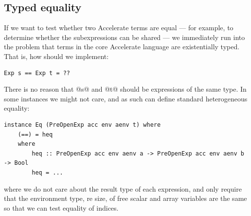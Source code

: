 \subsection{Typed equality}
\label{sec:equality}

If we want to test whether two Accelerate terms are equal --- for example, to
determine whether the subexpressions can be shared --- we immediately run into
the problem that terms in the core Accelerate language are existentially typed.
That is, how should we implement:
%
\begin{lstlisting}[style=haskell]
Exp s == Exp t = ??
\end{lstlisting}
%
There is no reason that @s@ and @t@ should be expressions of the same
type. In some instances we might not care, and as such can define standard
heterogeneous equality:
%
\begin{lstlisting}[style=haskell]
instance Eq (PreOpenExp acc env aenv t) where
    (==) = heq
    where
        heq :: PreOpenExp acc env aenv a -> PreOpenExp acc env aenv b -> Bool
        heq = ...
\end{lstlisting}
%
where we do not care about the result type of each expression, and only require
that the environment type, re size, of free scalar and array variables are the
same so that we can test equality of  indices.

